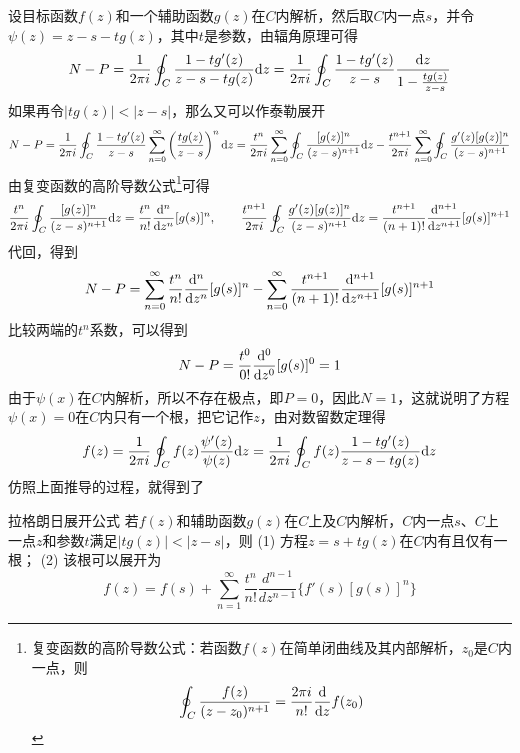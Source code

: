 \documentclass[main.tex]{subfiles}
\begin{document}
设目标函数\(f(z)\)和一个辅助函数\(g(z)\)在\(C\)内解析，然后取\(C\)内一点\(s\)，并令\(\psi(z) = z-s-tg(z)\)，其中\(t\)是参数，由辐角原理可得
\[N-P=\frac{1}{2\pi i}\oint_{C}\frac{1-tg'(z)}{z-s-tg(z)}{\rm d}z = \frac{1}{2\pi i}\oint_{C}\frac{1-tg'(z)}{z-s}\frac{{\rm d}z}{1-\frac{tg(z)}{z-s}}\]
如果再令\(|tg(z)|<|z-s|\)，那么又可以作泰勒展开
\[N-P = \frac{1}{2\pi i}\oint_{C}\frac{1-tg'(z)}{z-s}\sum_{n=0}^{\infty}\left(\frac{tg(z)}{z-s}\right)^n{\rm d}z = \frac{t^n}{2\pi i}\sum_{n=0}^{\infty}\oint_{C}\frac{[g(z)]^n}{(z-s)^{n+1}}{\rm d}z-\frac{t^{n+1}}{2 \pi i}\sum_{n=0}^{\infty}\oint_{C}\frac{g'(z)[g(z)]^{n}}{(z-s)^{n+1}}\]
由复变函数的高阶导数公式\footnote{复变函数的高阶导数公式：若函数\(f(z)\)在简单闭曲线及其内部解析，\(z_0\)是\(C\)内一点，则\[\oint_C \frac{f(z)}{(z-z_0)^{n+1}} = \frac{2\pi i}{n!}\dfrac{{\rm d}}{{\rm d}z}f(z_0)\]}可得
\[\frac{t^n}{2\pi i}\oint_{C}\frac{[g(z)]^n}{(z-s)^{n+1}}{\rm d}z = \frac{t^{n}}{n!}\frac{{\rm d}^n}{{\rm d}z^n}[g(s)]^{n}, \qquad \frac{t^{n+1}}{2\pi i}\oint_{C}\frac{g'(z)[g(z)]^n}{(z-s)^{n+1}}{\rm d}z = \frac{t^{n+1}}{(n+1)!}\frac{{\rm d}^{n+1}}{{\rm d}z^{n+1}}[g(s)]^{n+1}\]
代回，得到
\[N-P=\sum_{n=0}^{\infty}\frac{t^{n}}{n!}\frac{{\rm d}^n}{{\rm d}z^n}[g(s)]^{n}-\sum_{n=0}^{\infty}\frac{t^{n+1}}{(n+1)!}\frac{{\rm d}^{n+1}}{{\rm d}z^{n+1}}[g(s)]^{n+1}\]
比较两端的\(t^n\)系数，可以得到
\[N-P=\frac{t^{0}}{0!}\frac{{\rm d}^0}{{\rm d}z^0}[g(s)]^{0}=1\]
由于\(\psi(x)\)在\(C\)内解析，所以不存在极点，即\(P=0\)，因此\(N=1\)，这就说明了方程\(\psi(x)=0\)在\(C\)内只有一个根，把它记作\(z\)，由对数留数定理得
\[f(z)=\frac{1}{2\pi i}\oint_{C}f(z)\frac{\psi'(z)}{\psi(z)}{\rm d}z = \frac{1}{2\pi i}\oint_{C}f(z)\frac{1-tg'(z)}{z-s-tg(z)}{\rm d}z\]
仿照上面推导的过程，就得到了
\begin{theorem}{拉格朗日展开公式}
    若\(f(z)\)和辅助函数\(g(z)\)在\(C\)上及\(C\)内解析，\(C\)内一点\(s\)、\(C\)上一点\(z\)和参数\(t\)满足\(|tg(z)|<|z-s|\)，则\newline
    (1) 方程\(z=s+tg(z)\)在\(C\)内有且仅有一根；\newline
    (2) 该根可以展开为
    \[f(z) = f(s)+\sum_{n=1}^{\infty}\frac{t^n}{n!}\frac{d^{n-1}}{dz^{n-1}}\{f'(s)[g(s)]^n\}\]
\end{theorem}

\end{document}

